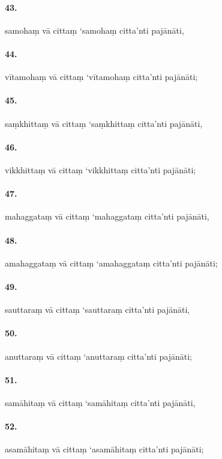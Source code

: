 \paragraph{43.} samohaṃ vā cittaṃ ‘samohaṃ citta’nti pajānāti,

\paragraph{44.} vītamohaṃ vā cittaṃ ‘vītamohaṃ citta’nti pajānāti;

\paragraph{45.} saṃkhittaṃ vā cittaṃ ‘saṃkhittaṃ citta’nti pajānāti,

\paragraph{46.} vikkhittaṃ vā cittaṃ ‘vikkhittaṃ citta’nti pajānāti;

\paragraph{47.} mahaggataṃ vā cittaṃ ‘mahaggataṃ citta’nti pajānāti,

\paragraph{48.} amahaggataṃ vā cittaṃ ‘amahaggataṃ citta’nti pajānāti;

\paragraph{49.} sauttaraṃ vā cittaṃ ‘sauttaraṃ citta’nti pajānāti,

\paragraph{50.} anuttaraṃ vā cittaṃ ‘anuttaraṃ citta’nti pajānāti;

\paragraph{51.} samāhitaṃ vā cittaṃ ‘samāhitaṃ citta’nti pajānāti,

\paragraph{52.} asamāhitaṃ vā cittaṃ ‘asamāhitaṃ citta’nti pajānāti;

